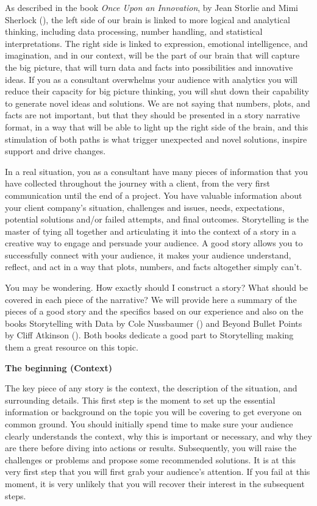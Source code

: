 \documentclass[
]{krantz}
\begin{document}
As described in the book \emph{Once Upon an Innovation}, by Jean Storlie and Mimi Sherlock (\citet{Sherlock2020}), the left side of our brain is linked to more logical and analytical thinking, including data processing, number handling, and statistical interpretations. The right side is linked to expression, emotional intelligence, and imagination, and in our context, will be the part of our brain that will capture the big picture, that will turn data and facts into possibilities and innovative ideas. If you as a consultant overwhelms your audience with analytics you will reduce their capacity for big picture thinking, you will shut down their capability to generate novel ideas and solutions. We are not saying that numbers, plots, and facts are not important, but that they should be presented in a story narrative format, in a way that will be able to light up the right side of the brain, and this stimulation of both paths is what trigger unexpected and novel solutions, inspire support and drive changes.

In a real situation, you as a consultant have many pieces of information that you have collected throughout the journey with a client, from the very first communication until the end of a project. You have valuable information about your client company's situation, challenges and issues, needs, expectations, potential solutions and/or failed attempts, and final outcomes. Storytelling is the master of tying all together and articulating it into the context of a story in a creative way to engage and persuade your audience. A good story allows you to successfully connect with your audience, it makes your audience understand, reflect, and act in a way that plots, numbers, and facts altogether simply can't.

You may be wondering. How exactly should I construct a story? What should be covered in each piece of the narrative? We will provide here a summary of the pieces of a good story and the specifics based on our experience and also on the books Storytelling with Data by Cole Nussbaumer (\citet{Knaflic2015}) and Beyond Bullet Points by Cliff Atkinson (\citet{Cliff2018}). Both books dedicate a good part to Storytelling making them a great resource on this topic.

\textbf{The beginning (Context)}

The key piece of any story is the context, the description of the situation, and surrounding details. This first step is the moment to set up the essential information or background on the topic you will be covering to get everyone on common ground. You should initially spend time to make sure your audience clearly understands the context, why this is important or necessary, and why they are there before diving into actions or results. Subsequently, you will raise the challenges or problems and propose some recommended solutions. It is at this very first step that you will first grab your audience's attention. If you fail at this moment, it is very unlikely that you will recover their interest in the subsequent steps.
\end{document}
